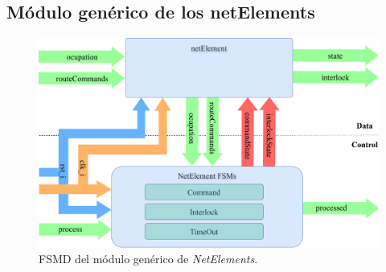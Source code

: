 \subsection{Módulo genérico de los netElements}

\lipsum[1]

\begin{figure}[H]
	\centering
	\includegraphics[width=1\textwidth]{Figuras/NET_module}
	\centering\caption{FSMD del módulo genérico de \textit{NetElements}.}
	\label{fig:NET_module}
\end{figure}

\lipsum[1]